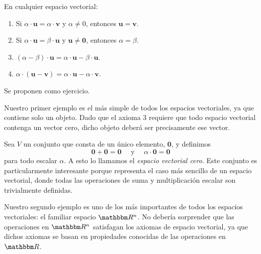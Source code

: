 \newpage

\begin{prop}{}{}
    En cualquier espacio vectorial:
    \begin{enumerate}[label=\roman*), topsep=6pt, itemsep=0pt]
        \item Si $\alpha \cdot \mathbf{u} = \alpha \cdot \mathbf{v}$ y $\alpha \neq 0$, entonces $\mathbf{u} = \mathbf{v}$.
        \item Si $\alpha \cdot \mathbf{u} = \beta \cdot \mathbf{u}$ y $\mathbf{u} \neq \mathbf{0}$, entonces $\alpha = \beta$.
        \item $(\alpha - \beta) \cdot \mathbf{u} = \alpha \cdot \mathbf{u} - \beta \cdot \mathbf{u}$.
        \item $\alpha \cdot (\mathbf{u} - \mathbf{v}) = \alpha \cdot \mathbf{u} - \alpha \cdot \mathbf{v}$.
    \end{enumerate}

    \tcblower
    \demostracion Se proponen como ejercicio.
\end{prop}

Nuestro primer ejemplo es el más simple de todos los espacios vectoriales, ya que contiene solo un objeto. Dado que el axioma 3 requiere que todo espacio vectorial contenga un vector cero, dicho objeto deberá ser precisamente ese vector.

\begin{examplebox}{}{}
    Sea $V$ un conjunto que consta de un único elemento, $\mathbf{0}$, y definimos
    $$\mathbf{0} + \mathbf{0} = \mathbf{0} \quad \text{ y } \quad \alpha \cdot \mathbf{0} = \mathbf{0}$$
    para todo escalar $\alpha$. A esto lo llamamos el \emph{espacio vectorial cero}. Este conjunto es particularmente interesante porque representa el caso más sencillo de un espacio vectorial, donde todas las operaciones de suma y multiplicación escalar son trivialmente definidas.
\end{examplebox}

Nuestro segundo ejemplo es uno de los más importantes de todos los espacios vectoriales: el familiar espacio $\RR[n]$. No debería sorprender que las operaciones en $\RR[n]$ satisfagan los axiomas de espacio vectorial, ya que dichos axiomas se basan en propiedades conocidas de las operaciones en $\RR$.

